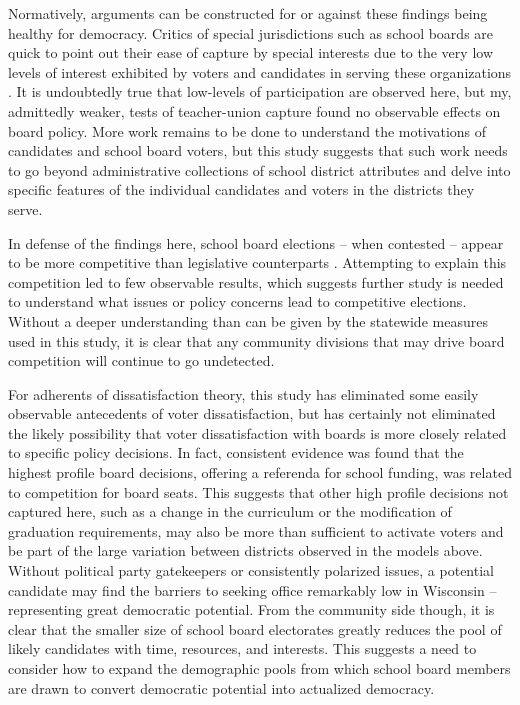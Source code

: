 Normatively, arguments can be constructed for or against these findings being healthy 
for democracy. Critics of special jurisdictions such as school boards are 
quick to point out their ease of capture by special interests due to the very low 
levels of interest exhibited by voters and candidates in serving these organizations 
\citep{RefWorks:207,berry2}. It is undoubtedly true that low-levels of participation are 
observed here, but my, admittedly weaker, tests of teacher-union capture found 
no observable effects on board policy. More work remains to be done to understand 
the motivations of candidates and school board voters, but this study suggests that 
such work needs to go beyond administrative collections of school district attributes 
and delve into specific features of the individual candidates and voters in the 
districts they serve. 

In defense of the findings here, school board elections -- when contested -- appear to 
be more competitive than legislative counterparts \citep{blaislago}. Attempting to 
explain this competition led to few observable results, which suggests further study 
is needed to understand what issues or policy concerns lead to competitive elections. 
Without a deeper understanding than can be given by the statewide measures used 
in this study, it is clear that any community divisions that may drive board competition 
will continue to go undetected. 

For adherents of dissatisfaction theory, this study 
has eliminated some easily observable antecedents of voter dissatisfaction, but has 
certainly not eliminated the likely possibility that voter dissatisfaction with 
boards is more closely related to specific policy decisions. In fact, consistent 
evidence was found that the highest profile board decisions, offering a 
referenda for school funding, was related to competition for board seats. This 
suggests that other high profile decisions not captured here, such as a change in the 
curriculum or the modification of graduation requirements, may also be more than 
sufficient to activate voters and be part of the large variation between districts 
observed in the models above. Without political party gatekeepers or consistently 
polarized issues, a potential candidate may find the barriers to seeking office 
remarkably low in Wisconsin -- representing great democratic potential. From the 
community side though, it is clear that the smaller size of school board electorates 
greatly reduces the pool of likely candidates with time, resources, and interests. 
This suggests a need to consider how to expand the demographic pools from which 
school board members are drawn to convert democratic potential into actualized 
democracy. 

